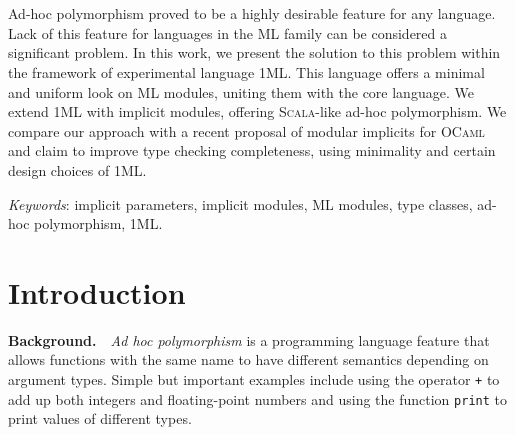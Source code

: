 \documentclass{spbau-diploma}
\begin{document}
\maketitle
\tableofcontents
\section*{}

Ad-hoc polymorphism proved to be a highly desirable feature for any language. Lack of this feature for languages in the \textsc{ML} family can be considered a significant problem. In this work, we present the solution to this problem within the framework of experimental language \textsc{1ML}. This language offers a minimal and uniform look on \textsc{ML} modules, uniting them with the core language. We extend \textsc{1ML} with implicit modules, offering \textsc{Scala}-like ad-hoc polymorphism. We compare our approach with a recent proposal of modular implicits for \textsc{OCaml} and claim to improve type checking completeness, using minimality and certain design choices of \textsc{1ML}.

\textit{Keywords}: implicit parameters, implicit modules, \textsc{ML} modules, type classes, ad-hoc polymorphism, \textsc{1ML}.

\section{Introduction}

\textbf{Background.}~~\textit{Ad hoc polymorphism} is a programming language feature that allows functions with the same name to have different semantics depending on argument types. Simple but important examples include using the operator \texttt{+} to add up both integers and floating-point numbers and using the function \texttt{print} to print values of different types.
\end{document}
